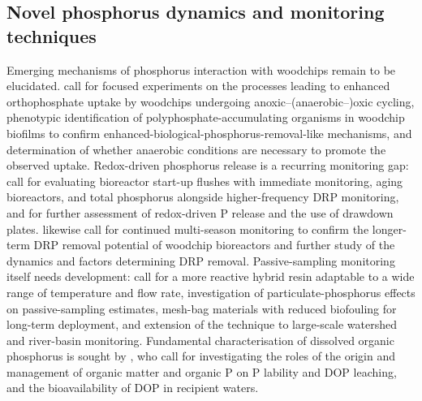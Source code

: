 \documentclass[11pt]{article}
\begin{document}
\subsection{Novel phosphorus dynamics and monitoring techniques}
Emerging mechanisms of phosphorus interaction with woodchips remain to be elucidated. \textcite{Zhang2024b} call for focused experiments on the processes leading to enhanced orthophosphate uptake by woodchips undergoing anoxic--(anaerobic--)oxic cycling, phenotypic identification of polyphosphate-accumulating organisms in woodchip biofilms to confirm enhanced-biological-phosphorus-removal-like mechanisms, and determination of whether anaerobic conditions are necessary to promote the observed uptake. Redox-driven phosphorus release is a recurring monitoring gap: \textcite{Bailon2025} call for evaluating bioreactor start-up flushes with immediate monitoring, aging bioreactors, and total phosphorus alongside higher-frequency DRP monitoring, and for further assessment of redox-driven P release and the use of drawdown plates. \textcite{Rivas2020} likewise call for continued multi-season monitoring to confirm the longer-term DRP removal potential of woodchip bioreactors and further study of the dynamics and factors determining DRP removal. Passive-sampling monitoring itself needs development: \textcite{Li2020b} call for a more reactive hybrid resin adaptable to a wide range of temperature and flow rate, investigation of particulate-phosphorus effects on passive-sampling estimates, mesh-bag materials with reduced biofouling for long-term deployment, and extension of the technique to large-scale watershed and river-basin monitoring. Fundamental characterisation of dissolved organic phosphorus is sought by \textcite{Liu2024b}, who call for investigating the roles of the origin and management of organic matter and organic P on P lability and DOP leaching, and the bioavailability of DOP in recipient waters.
\end{document}
